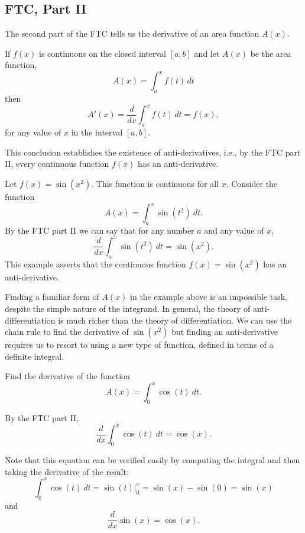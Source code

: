 \documentclass[handout]{ximera}
\begin{document}
\subsection{FTC, Part II}

The second part of the FTC tells us the derivative of an area function $A(x)$.  


\begin{theorem}
If $f(x)$ is continuous on the closed interval $[a, b]$ and let $A(x)$ be the area function,
\[
A(x) = \int_a^x f(t) \, dt
\]
then 
\[A'(x) = \frac{d}{dx}\int_a^x f(t) \, dt = f(x), \]
for any value of $x$ in the interval $[a, b]$.
\end{theorem}

This conclusion establishes the existence of anti-derivatives, i.e., 
by the FTC part II, every continuous function $f(x)$ has an anti-derivative. 




\begin{example}[example 2]
 Let $f(x) = \sin(x^2)$.  This function is continuous for all $x$.  Consider the function
\[A(x) = \int_a^x \sin(t^2) \ dt.\]
By the FTC part II
we can say that for any number $a$ and any value of $x$, 
\[\frac{d}{dx}\int_a^x \sin(t^2) \ dt = \sin(x^2).\]
This example asserts that the continuous function $f(x) = \sin(x^2)$ has an anti-derivative.  
\end{example}



\begin{remark}
Finding a familiar form of $A(x)$ in the example above is an impossible task, despite the simple nature of the integrand.  
In general, the theory of anti-differentiation is much richer than the theory of differentiation. 
We can use the chain rule to find the derivative of $\sin(x^2)$ but finding an anti-derivative requires us to resort to 
using a new type of function, defined in terms of a definite integral.
\end{remark}


\begin{example}[example 3]
Find the derivative of the function
\[A(x) = \int_0^x \cos(t) \ dt.\]

By the FTC part II,
\[\frac{d}{dx}\int_0^x \cos(t) \ dt = \cos(x).\]
 
Note that this equation can be verified easily by computing the integral and then taking the derivative of the result:
\[\int_0^x \cos(t) \ dt = \sin(t) \Big|_0^x = \sin(x) - \sin(0) = \sin(x)\]
and 
\[\frac{d}{dx} \sin(x) = \cos(x).\]
\end{example}
\end{document}

